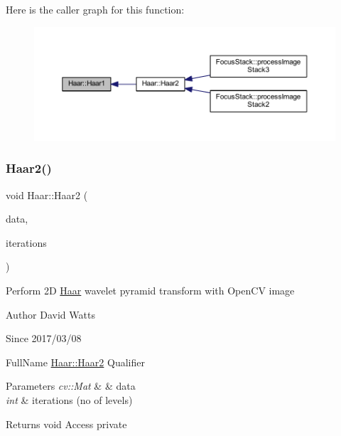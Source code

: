 Here is the caller graph for this function\+:
\nopagebreak
\begin{figure}[H]
\begin{center}
\leavevmode
\includegraphics[width=350pt]{class_haar_a44ab3d3043f2a9c2145629a242e6ed0f_icgraph}
\end{center}
\end{figure}
\mbox{\label{class_haar_afde8fa7a1d65b505185a29fc7eaf4b2d}} 
\subsubsection{\texorpdfstring{Haar2()}{Haar2()}\hspace{0.1cm}{\footnotesize\ttfamily [1/2]}}
{\footnotesize\ttfamily void Haar\+::\+Haar2 (\begin{DoxyParamCaption}\item[{cv\+::\+Mat \&}]{data,  }\item[{int}]{iterations }\end{DoxyParamCaption})\hspace{0.3cm}{\ttfamily [static]}}

Perform 2D \hyperlink{class_haar}{Haar} wavelet pyramid transform with Open\+CV image

\begin{DoxyAuthor}{Author}
David Watts 
\end{DoxyAuthor}
\begin{DoxySince}{Since}
2017/03/08
\end{DoxySince}
Full\+Name \hyperlink{class_haar_afde8fa7a1d65b505185a29fc7eaf4b2d}{Haar\+::\+Haar2} Qualifier 
\begin{DoxyParams}{Parameters}
{\em cv\+::\+Mat} & \& data \\
\hline
{\em int} & iterations (no of levels) \\
\hline
\end{DoxyParams}
\begin{DoxyReturn}{Returns}
void Access private 
\end{DoxyReturn}


